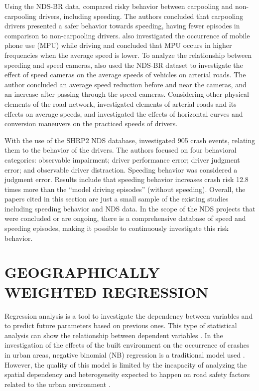 Using the NDS-BR data, \textcite{Bastos2021} compared risky behavior between carpooling and non-carpooling drivers, including speeding. The authors concluded that carpooling drivers presented a safer behavior towards speeding, having fewer episodes in comparison to non-carpooling drivers. \textcite{Bastos2020a} also investigated the occurrence of mobile phone use (MPU) while driving and concluded that MPU occurs in higher frequencies when the average speed is lower. To analyze the relationship between speeding and speed cameras, \textcite{Amancio2021} also used the NDS-BR dataset to investigate the effect of speed cameras on the average speeds of vehicles on arterial roads. The author concluded an average speed reduction before and near the cameras, and an increase after passing through the speed cameras. Considering other physical elements of the road network, \textcite{suguinoshitaFATORESDETERMINANTESPARA2020} investigated elements of arterial roads and its effects on average speeds, and \textcite{szeligaIMPACTOCURVASHORIZONTAIS2020,szeligaAnaliseVelocidadePraticada2021} investigated the effects of horizontal curves and conversion maneuvers on the practiced speeds of drivers.

With the use of the SHRP2 NDS database, \textcite{Dingus2016} investigated 905 crash events, relating them to the behavior of the drivers. The authors focused on four behavioral categories: observable impairment; driver performance error; driver judgment error; and observable driver distraction. Speeding behavior was considered a judgment error. Results include that speeding behavior increases crash risk 12.8 times more than the ``model driving episodes'' (without speeding). Overall, the papers cited in this section are just a small sample of the existing studies including speeding behavior and NDS data. In the scope of the NDS projects that were concluded or are ongoing, there is a comprehensive database of speed and speeding episodes, making it possible to continuously investigate this risk behavior. 

\section{GEOGRAPHICALLY WEIGHTED REGRESSION} \label{sec:gwr}

Regression analysis is a tool to investigate the dependency between variables and to predict future parameters based on previous ones. This type of statistical analysis can show the relationship between dependent variables \cite{Lindley1987}. In the investigation of the effects of the built environment on the occurrence of crashes in urban areas, negative binomial (NB) regression is a traditional model used \cite{Wei2013, Zhang2014}. However, the quality of this model is limited by the incapacity of analyzing the spatial dependency and heterogeneity expected to happen on road safety factors related to the urban environment \cite{Obelheiro2019}.


